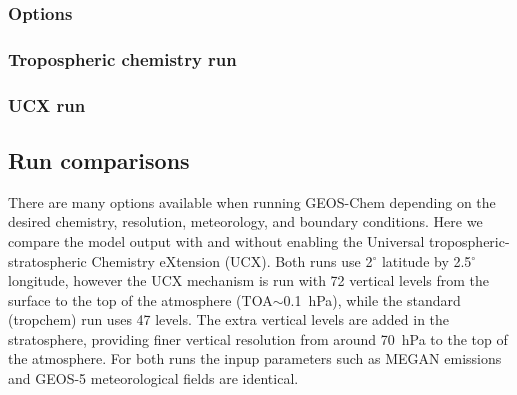     \subsubsection{Options}
    
    \subsubsection{Tropospheric chemistry run}
    
    \subsubsection{UCX run}
    
    \subsection{Run comparisons}
    
      There are many options available when running GEOS-Chem depending on the desired chemistry, resolution, meteorology, and boundary conditions.
      Here we compare the model output with and without enabling the Universal tropospheric-stratospheric Chemistry eXtension (UCX).
      Both runs use 2$^{\circ}$ latitude by 2.5$^{\circ}$ longitude, however the UCX mechanism is run with 72 vertical levels from the surface to the top of the atmosphere (TOA$\sim$0.1~hPa), while the standard (tropchem) run uses 47 levels.
      The extra vertical levels are added in the stratosphere, providing finer vertical resolution from around 70~hPa to the top of the atmosphere.
      For both runs the inpup parameters such as MEGAN emissions and GEOS-5 meteorological fields are identical.
      
